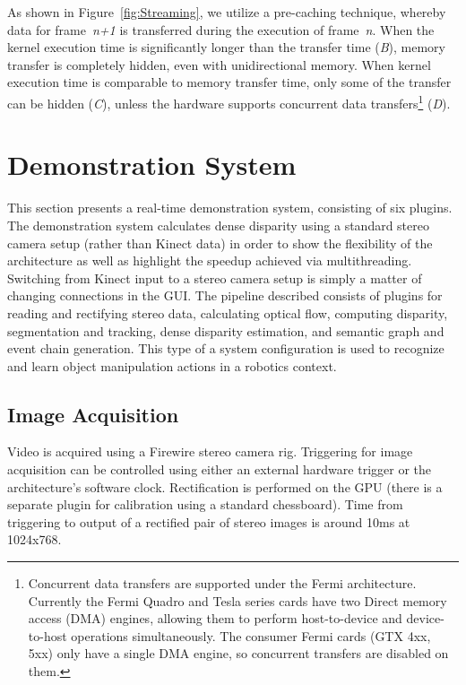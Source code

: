 As shown in Figure~\ref{fig:Streaming}, we utilize a pre-caching technique, whereby data for frame~\emph{n+1} is transferred during the execution of frame~\emph{n}. When the kernel execution time is significantly longer than the transfer time (\emph{B}), memory transfer is completely hidden, even with unidirectional memory. When kernel execution time is comparable to memory transfer time, only some of the transfer can be hidden (\emph{C}), unless the hardware supports concurrent data transfers\footnote{Concurrent data transfers are supported under the Fermi architecture\cite{NVIDIA_Fermi}. Currently the Fermi Quadro and Tesla series cards have two Direct memory access (DMA) engines\cite{NVIDIA_Concurrent}, allowing them to perform host-to-device and device-to-host operations simultaneously. The consumer Fermi cards (GTX 4xx, 5xx) only have a single DMA engine, so concurrent transfers are disabled on them.}  (\emph{D}).



\section{Demonstration System}
This section presents a real-time demonstration system, consisting of six plugins. The demonstration system calculates dense disparity using a standard stereo camera setup (rather than Kinect data) in order to show the flexibility of the architecture as well as highlight the speedup achieved via multithreading. Switching from Kinect input to a stereo camera setup is simply a matter of changing connections in the GUI. The pipeline described consists of plugins for reading  and rectifying stereo data, calculating optical flow\cite{PauwelsArchitecture}, computing disparity\cite{PauwelsArchitecture}, segmentation and tracking\cite{Abramov_3DSegmentation}, dense disparity estimation, and semantic graph and event chain generation\cite{Aksoy10,Aksoy11}. This type of a system configuration is used to recognize and learn object manipulation actions in a robotics context.

\subsection{Image Acquisition}
Video is acquired using a Firewire stereo camera rig. Triggering for image acquisition can be controlled using either an external hardware trigger or the architecture's software clock. Rectification is performed on the GPU (there is a separate plugin for calibration using a standard chessboard). Time from triggering to output of a rectified pair of stereo images is around 10ms at 1024x768.

